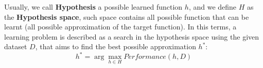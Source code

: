 \documentclass[10pt, letterpaper]{report}
\begin{document}
Usually, we call \textbf{Hypothesis} a possible learned function $h$, and we define $H$ as the \textbf{Hypothesis space}, such space contains all possible function that can be learnt (all possible approximation of the target function). In this terms, a learning problem is described as a search in the hypothesis space using the given dataset $D$, that aims to find the best possible approximation $h^*$:\begin{equation}
    h^*=\arg \max_{h\in H} Performance(h,D)
\end{equation} 
\end{document}
